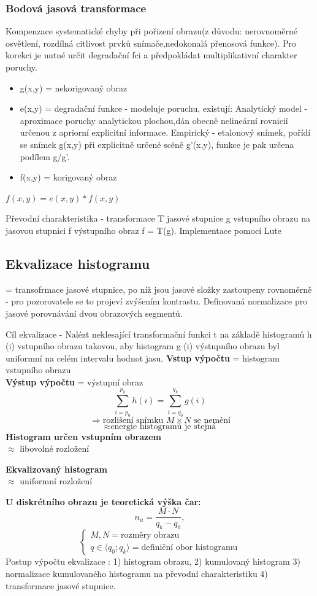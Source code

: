 \subsubsection{Bodová jasová transformace}
Kompenzace systematické chyby při pořizení obrazu(z důvodu: nerovnoměrné osvětlení, rozdílná citlivost prvků snímače,nedokonalá přenosová funkce). Pro korekci je nutné 
určit degradační fci a předpokládat multiplikativní charakter poruchy.
\begin{itemize}
    \item g(x,y) = nekorigovaný obraz
    \item e(x,y) = degradační funkce - modeluje poruchu, existují: Analytický model -aproximace poruchy analytickou plochou,dán obecně nelineární rovnicií určenou z apriorní explicitní
    informace. Empirický - etalonový snímek, pořídí se snímek g(x,y) při explicitně určené scéně g'(x,y), funkce je pak určena podílem g/g'.
    \item f(x,y) = korigovaný obraz 
\end{itemize}
$f(x,y) = e(x,y)*f(x,y)$

Převodní charakteristika - transformace T jasové stupnice g vstupního obrazu na jasovou stupnici f výstupního obraz f = T(g). Implementace pomocí Lute

\subsection{Ekvalizace histogramu} 
= transofrmace jasové stupnice, po níž jsou jasové složky zastoupeny rovnoměrně - pro pozorovatele se to projeví zvýšením kontrastu. Definovaná normalizace pro jasové porovnávání
dvou obrazových segmentů. 

Cíl ekvalizace - Nalézt neklesající transformační funkci t na základě histogramů h (i) vstupního obrazu takovou, aby histogram g (i) výstupního obrazu byl uniformní na celém 
intervalu hodnot jasu.
\textbf{Vstup výpočtu} = histogram vstupního obrazu \\
\textbf{Výstup výpočtu} = výstupní obraz
\[
\sum_{i = p_0}^{p_k} h(i) = \sum_{i = q_0}^{q_k} g(i)
\]
\[
\Rightarrow \text{rozlišení snímku } M \times N \text{ se nemění}
\]
\[
\approx \text{energie histogramů je stejná}
\]
\textbf{Histogram určen vstupním obrazem} \\
$\approx$ libovolné rozložení

\textbf{Ekvalizovaný histogram} \\
$\approx$ uniformní rozložení

\textbf{U diskrétního obrazu je teoretická výška čar:}
\[
n_u = \frac{M \cdot N}{q_k - q_0},
\]
\[
\begin{cases}
M, N = \text{rozměry obrazu} \\
q \in \langle q_0; q_k \rangle = \text{definiční obor histogramu}
\end{cases}
\]
Postup výpočtu ekvalizace : 1) histogram obrazu, 2) kumulovaný histogram 3) normalizace kumulovaného histogramu na převodní charakteristiku 4) transformace jasové stupnice. 

